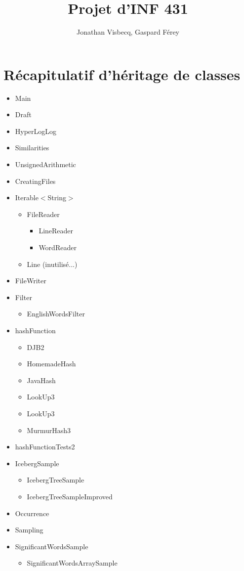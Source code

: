 \documentclass[12pt,a4paper,titlepage]{article}
\author{Jonathan Visbecq, Gaspard Férey}
\title{Projet d'INF 431}
\newcommand{\1}{\mbox{1\hspace{-.28em}l}}
\begin{document}
\section{Récapitulatif d'héritage de classes}

\begin{itemize}
\item Main
\item Draft
\item HyperLogLog
\item Similarities
\item UnsignedArithmetic
\item CreatingFiles
\item Iterable$<$String$>$
	\begin{itemize}
	\item FileReader
		\begin{itemize}
		\item LineReader
		\item WordReader
		\end{itemize}
	\item Line (inutilisé...)
	\end{itemize}
\item FileWriter
\item Filter
	\begin{itemize}
	\item EnglishWordsFilter
	\end{itemize}
\item hashFunction
	\begin{itemize}
	\item DJB2
	\item HomemadeHash
	\item JavaHash
	\item LookUp3
	\item LookUp3
	\item MurmurHash3
	\end{itemize}
\item hashFunctionTests2
\item IcebergSample
	\begin{itemize}
	\item IcebergTreeSample
	\item IcebergTreeSampleImproved
	\end{itemize}
\item Occurrence
\item Sampling
\item SignificantWordsSample
	\begin{itemize}
	\item SignificantWordsArraySample
	\end{itemize}
\end{itemize}
\end{document}
